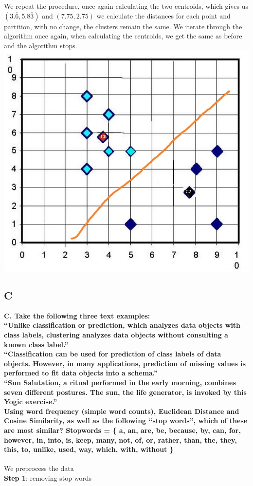\documentclass{article}
\theoremstyle{remark}
\begin{document}
	We repeat the procedure, once again calculating the two centroids, which gives us $(3.\overline{6},5.8\overline{3})$ and $(7.75,2.75)$ we calculate the distances for each point and partition, with no change, the clusters remain the same. We iterate through the algorithm once again, when calculating the centroids, we get the same as before and the algorithm stops. 
	\\\includegraphics[scale = 0.5]{centroids2.jpg}\\
	
	\newpage\subsection{C}
	\textbf{C. Take the following three text examples: \\
		“Unlike classification or prediction, which analyzes data objects with class labels, clustering analyzes data objects without consulting a known class label.”\\
		“Classification can be used for prediction of class labels of data objects. However, in many applications, prediction of missing values is performed to fit data objects into a schema.”\\
		“Sun Salutation, a ritual performed in the early morning, combines seven different postures. The sun, the life generator, is invoked by this Yogic exercise.”\\
		Using word frequency (simple word counts), Euclidean Distance and Cosine Similarity, as well as the following “stop words”, which of these are most similar? Stopwords = \{ a, an, are, be, because, by, can, for, however, in, into, is, keep, many, not,  of, or, rather, than, the, they, this, to, unlike, used, way, which, with, without \} }\\\\
	We preprocess the data\\
	\textbf{Step 1}: removing stop words\\
	
\end{document}
